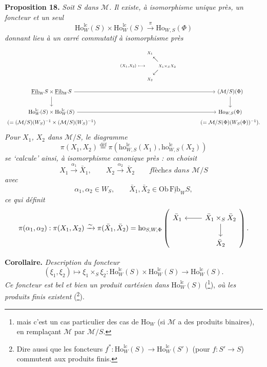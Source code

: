 \documentclass[11pt]{article}
\newcommand{\printedpage}[1]{\marginpar{\footnotesize p.~#1}}
\newcommand{\msp}[1]{\marginpar{\footnotesize [#1]}}
\newcommand{\Fibu}{\underline{\mathrm{Fib}}}
\newcommand{\Ho}{\mathrm{Ho}}
\newcommand{\ho}{\mathrm{ho}}
\newcommand{\lc}{\mathrm{lc}}
\begin{document}
\textbf{Proposition 18.} \textit{Soit $S$ dans $\mathcal{M}$. Il existe, à isomorphisme unique près, un foncteur et un seul}
\[
\Ho^{\lc}_W(S) \times \Ho^{\lc}_W(S) \xrightarrow{\pi} \Ho_{W,S}(\Phi)
\]
\textit{donnant lieu à un carré commutatif à isomorphisme près}
\[
\begin{tikzcd}[ampersand replacement=\&, column sep=large]
 \& {\scriptstyle (X_1,X_2)\ \longmapsto\ \begin{array}{@{}c@{}c@{}c@{}} \scriptstyle X_1 & & \\ & \nwarrow & \\ & & \scriptstyle X_1 \times_S X_2 \\ & \swarrow & \\ \scriptstyle X_2 & & \end{array}} \& \\[-3ex]
\Fibu_W S \times \Fibu_W S \arrow[rr] \arrow[d] \& \& (\mathcal{M}/S)(\Phi) \arrow[d] \\
\Ho^{\lc}_W(S) \times \Ho^{\lc}_W(S) \arrow[rr] \& \& \Ho_{W,S}(\Phi) \\[-4ex]
(= (\mathcal{M}/S)(W_S)^{-1} \times (\mathcal{M}/S)(W_S)^{-1}) \& \& (= \mathcal{M}/S(\Phi)(W_S(\Phi))^{-1}).
\end{tikzcd}
\]
\textit{Pour $X_1$, $X_2$ dans $\mathcal{M}/S$, le diagramme}
\[
\pi(X_1, X_2) \overset{\text{déf}}{=} \pi(\ho^{\lc}_{W,S}(X_1), \ho^{\lc}_{W,S}(X_2))
\]
\textit{se `calcule' ainsi, à isomorphisme canonique près : on choisit}
\[
X_1 \xrightarrow{\alpha_1} \bar{X}_1, \qquad X_2 \xrightarrow{\alpha_2} \bar{X}_2 \qquad \textit{flèches dans } \mathcal{M}/S
\]
\textit{avec}
\[
\alpha_1, \alpha_2 \in W_S, \qquad \bar{X}_1, \bar{X}_2 \in \mathrm{Ob}\, \Fibu_W S,
\]
\textit{ce qui définit}
\[
\pi(\alpha_1, \alpha_2) : \pi(X_1, X_2) \xrightarrow{\sim} \pi(\bar{X}_1, \bar{X}_2) = \ho_{S,W,\Phi}
\left(
\begin{tikzcd}
\bar{X}_1 & \bar{X}_1 \times_S \bar{X}_2 \arrow[l] \arrow[d] \\
 & \bar{X}_2
\end{tikzcd}
\right).
\]

\setcounter{footnote}{131}

\printedpage{160}

\msp{page 247}

\textbf{Corollaire.} {\itshape Description du foncteur
\[
(\xi_1,\xi_2)\longmapsto\xi_1\times_S\xi_2 : \Ho^{\lc}_W(S)\times\Ho^{\lc}_W(S)\longrightarrow\Ho^{\lc}_W(S).
\]
Ce foncteur est bel et bien un produit cartésien dans} $\Ho^{\lc}_W(S)$ (\footnote{mais c'est un cas particulier des cas de $\Ho_W$ (si $\mathcal{M}$ a des produits binaires), en remplaçant $\mathcal{M}$ par $\mathcal{M}/S$.}), {\itshape où les produits finis existent} (\footnote{Dire aussi que les foncteurs $f^* : \Ho^{\lc}_W(S)\longrightarrow\Ho^{\lc}_W(S')$ (pour $f : S'\longrightarrow S$) commutent aux produits finis.}).
\end{document}
